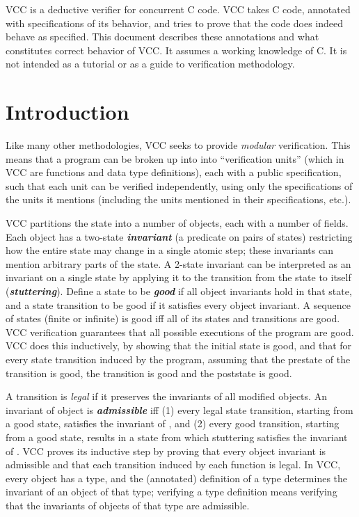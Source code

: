 \documentclass[preprint,nocopyrightspace]{sigplanconf}
\newcommand{\Def}[1]{\textit{\textbf{#1}}}
\begin{document}
\ifdense
\renewcommand{\labelitemi}{{\footnotesize \centeroncapheight{$\bullet$}}}
\fi

VCC is a deductive verifier for concurrent C code. VCC takes C code,
annotated with specifications of its behavior, and tries to prove that
the code does indeed behave as specified. This document describes
these annotations and what constitutes correct behavior of VCC.
It assumes a working knowledge of C. It is not intended as a tutorial
or as a guide to verification methodology.

\section{Introduction}

Like many other methodologies, VCC seeks to provide \emph{modular}
verification. This means that a program can be broken up into into
``verification units'' (which in VCC are functions and data type
definitions), each with a public specification, such that each unit
can be verified independently, using only the specifications of the
units it mentions (including the units mentioned in their
specifications, etc.). 

VCC partitions the state into a number of objects, each with a number
of fields. Each object has a two-state \Def{invariant} (a predicate on pairs
of states) restricting how the entire state may change in a single
atomic step; these invariants can mention arbitrary parts of the
state. A 2-state invariant can be interpreted as an invariant on a
single state by applying it to the transition from the state to itself
(\Def{stuttering}). Define a state to be \Def{good} if all object
invariants hold in that state, and a state transition to be good if it
satisfies every object invariant. A sequence of states (finite or
infinite) is good iff all of its states and transitions are good. VCC
verification guarantees that all possible executions of the program
are good. VCC does this inductively, by showing that the initial
state is good, and that for every state transition induced by the program,
assuming that the prestate of the transition is good, the transition
is good and the poststate is good.

A transition is \emph{legal} if it preserves the invariants of all
modified objects. An invariant of object  is \Def{admissible}
iff (1) every legal state transition, starting from a good state,
satisfies the invariant of , and (2) every good transition,
starting from a good state, results in a state from which stuttering
satisfies the invariant of . VCC proves its inductive step by
proving that every object invariant is admissible and that each
transition induced by each function is legal.  In VCC, every object
has a type, and the (annotated) definition of a type determines the
invariant of an object of that type; verifying a type definition means
verifying that the invariants of objects of that type are admissible.
\end{document}
